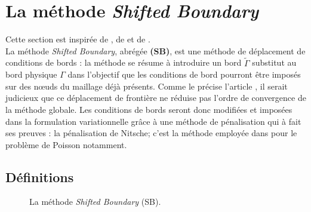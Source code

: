 \section{La méthode \textit{Shifted Boundary}}
\noindent Cette section est inspirée de \citet{main_shifted_2018, main_shifted_2018_2}, de \citet{burman_ghost_2010} et de \citet{nouveau_high-order_2019}.\\

\noindent La méthode \textit{Shifted Boundary}, abrégée \textbf{(SB)}, est une méthode de déplacement de conditions de bords : la méthode se résume à introduire un bord $\widetilde{\Gamma}$ substitut au bord physique $\Gamma$ dans l'objectif que les conditions de bord pourront être imposés sur des n\oe uds du maillage déjà présents. Comme le précise l'article \citet{main_shifted_2018}, il serait judicieux que ce déplacement de frontière ne réduise pas l'ordre de convergence de la méthode globale. Les conditions de bords seront donc modifiées et imposées dans la formulation variationnelle grâce à une méthode de pénalisation qui à fait ses preuves : la pénalisation de Nitsche; c'est la méthode employée dans \citet{nouveau_high-order_2019} pour le problème de Poisson notamment.

\subsection{Définitions}
\begin{figure}[H]
	\centering
	\caption{La méthode \textit{Shifted Boundary} (SB).}
	\label{fig:sbm_method}
\end{figure}

